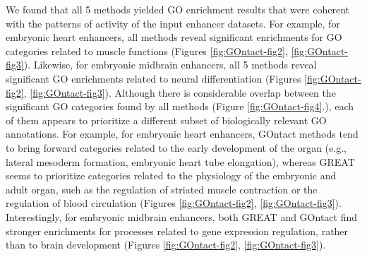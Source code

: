 We found that all 5 methods yielded GO enrichment results that were coherent with the patterns of activity of the input enhancer datasets. For example, for embryonic heart enhancers, all methods reveal significant enrichments for GO categories related to muscle functions (Figures \ref{fig:GOntact-fig2}, \ref{fig:GOntact-fig3}). Likewise, for embryonic midbrain enhancers, all 5 methods reveal significant GO enrichments related to neural differentiation (Figures \ref{fig:GOntact-fig2}, \ref{fig:GOntact-fig3}). Although there is considerable overlap between the significant GO categories found by all methods (Figure \ref{fig:GOntact-fig4}.), each of them appears to prioritize a different subset of biologically relevant GO annotations. For example, for embryonic heart enhancers, GOntact methods tend to bring forward categories related to the early development of the organ (e.g., lateral mesoderm formation, embryonic heart tube elongation), whereas GREAT seems to prioritize categories related to the physiology of the embryonic and adult organ, such as the regulation of striated muscle contraction or the regulation of blood circulation (Figures \ref{fig:GOntact-fig2}, \ref{fig:GOntact-fig3}). Interestingly, for embryonic midbrain enhancers, both GREAT and GOntact find stronger enrichments for processes related to gene expression regulation, rather than to brain development (Figures \ref{fig:GOntact-fig2}, \ref{fig:GOntact-fig3}).

